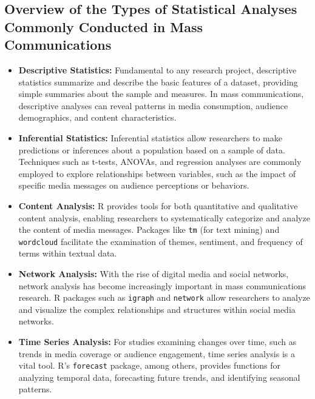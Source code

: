 \documentclass[
]{book}
\begin{document}
\hypertarget{overview-of-the-types-of-statistical-analyses-commonly-conducted-in-mass-communications}{%
\subsection*{Overview of the Types of Statistical Analyses Commonly Conducted in Mass Communications}\label{overview-of-the-types-of-statistical-analyses-commonly-conducted-in-mass-communications}}

\begin{itemize}
\item
  \textbf{Descriptive Statistics:} Fundamental to any research project, descriptive statistics summarize and describe the basic features of a dataset, providing simple summaries about the sample and measures. In mass communications, descriptive analyses can reveal patterns in media consumption, audience demographics, and content characteristics.
\item
  \textbf{Inferential Statistics:} Inferential statistics allow researchers to make predictions or inferences about a population based on a sample of data. Techniques such as t-tests, ANOVAs, and regression analyses are commonly employed to explore relationships between variables, such as the impact of specific media messages on audience perceptions or behaviors.
\item
  \textbf{Content Analysis:} R provides tools for both quantitative and qualitative content analysis, enabling researchers to systematically categorize and analyze the content of media messages. Packages like \texttt{tm} (for text mining) and \texttt{wordcloud} facilitate the examination of themes, sentiment, and frequency of terms within textual data.
\item
  \textbf{Network Analysis:} With the rise of digital media and social networks, network analysis has become increasingly important in mass communications research. R packages such as \texttt{igraph} and \texttt{network} allow researchers to analyze and visualize the complex relationships and structures within social media networks.
\item
  \textbf{Time Series Analysis:} For studies examining changes over time, such as trends in media coverage or audience engagement, time series analysis is a vital tool. R's \texttt{forecast} package, among others, provides functions for analyzing temporal data, forecasting future trends, and identifying seasonal patterns.
\end{itemize}
\end{document}
